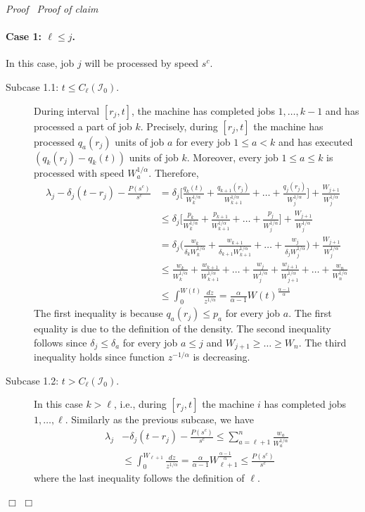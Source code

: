 \documentclass[11pt]{article}
\newenvironment{proof}{\noindent\emph{Proof\ }}{\hspace*{\fill}$\Box$\medskip}
\newenvironment{claimproof}{\noindent\emph{Proof of claim\ }}{\hspace*{\fill}$\Box$\medskip}
\begin{document}
\begin{proof}
\begin{claimproof}
\paragraph{Case 1: $\ell \leq j$.} In this case, job $j$ will be processed by speed $s^{c}$.
	\begin{description}
		\item[Subcase 1.1: $t \leq C_{\ell}(\mathcal{I}_{0})$.]
		During interval $[r_{j},t]$, the machine has completed jobs $1, \ldots, k-1$ and has processed a part of job $k$.
		Precisely, during $[r_{j},t]$ the machine has processed $q_{a}(r_{j})$ units of job $a$
		for every job $1 \leq a < k$ and has executed $(q_{k}(r_{j}) - q_{k}(t))$ units of job $k$.   
		Moreover, every job $1 \leq a \leq k$ is processed with speed $W_{a}^{1/\alpha}$.  
		Therefore,  
\begin{align*}
\lambda_{j} - \delta_{j} (t-r_{j}) - \frac{P(s^{c})}{s^{c}}
&= \delta_{j} \biggl[ \frac{q_{k}(t)}{W_{k}^{1/\alpha}} + 
		\frac{q_{k+1}(r_{j})}{W_{k+1}^{1/\alpha}} + \ldots + \frac{q_{j}(r_{j})}{W_{j}^{1/\alpha}} \biggl]
		+ \frac{W_{j+1}}{W_{j}^{1/\alpha}} \\
&\leq \delta_{j} \biggl[ \frac{p_{k}}{W_{k}^{1/\alpha}} + 
		\frac{p_{k+1}}{W_{k+1}^{1/\alpha}} + \ldots + \frac{p_{j}}{W_{j}^{1/\alpha}} \biggl]
		+ \frac{W_{j+1}}{W_{j}^{1/\alpha}} \\
&= \delta_{j} \biggl(  \frac{w_{k}}{\delta_{k} W_{k}^{1/\alpha}} + 
		\frac{w_{k+1}}{\delta_{k+1} W_{k+1}^{1/\alpha}} + \ldots + \frac{w_{j}}{\delta_{j} W_{j}^{1/\alpha}} \biggl)
		+ \frac{W_{j+1}}{ W_{j}^{1/\alpha}} \\
&\leq \frac{w_{k}}{W_{k}^{1/\alpha}} + 
		\frac{w_{k+1}}{W_{k+1}^{1/\alpha}} + \ldots + \frac{w_{j}}{W_{j}^{1/\alpha}}
		+ \frac{w_{j+1}}{W_{j+1}^{1/\alpha}} + \ldots + \frac{w_{n}}{W_{n}^{1/\alpha}} \\
&\leq \int_{0}^{W(t)} \frac{dz}{z^{1/\alpha}}  
= \frac{\alpha}{\alpha - 1} W(t)^{\frac{\alpha-1}{\alpha}} 	
\end{align*}
The first inequality is because $q_{a}(r_{j}) \leq p_{a}$ for every job $a$.
		The first equality is due to the definition of the density.
		The second inequality follows since $\delta_{j} \leq \delta_{a}$ for every job $a \leq j$
		and $W_{j+1} \geq \ldots \geq W_{n}$.
		The third inequality holds since function $z^{-1/\alpha}$ is decreasing. 


		\item[Subcase 1.2: $t > C_{\ell}(\mathcal{I}_{0})$.]
		In this case $k > \ell$, i.e., during $[r_{j},t]$ the machine $i$ has completed 
		jobs $1, \ldots, \ell$. Similarly as the previous subcase, we have 
\begin{align*}
\lambda_{j} &- \delta_{j} (t-r_{j}) -  \frac{P(s^{c})}{s^{c}}
	\leq   \sum_{a=\ell+1}^{n} \frac{w_{a}}{W_{a}^{1/\alpha}} \\
&\leq \int_{0}^{W_{\ell+1}} \frac{dz}{z^{1/\alpha}} 
		= \frac{\alpha}{\alpha - 1} W_{\ell+1}^{\frac{\alpha-1}{\alpha}} 	\leq \frac{P(s^{c})}{s^{c}} 
\end{align*}
where the last inequality follows the definition of $\ell$.
\end{description}


\end{claimproof}
\end{proof}
\end{document}
